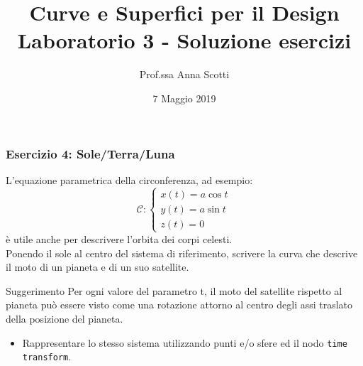 \documentclass{beamer}
\title[Curve e Sup. - Lab 3]{Curve e Superfici per il Design \\ Laboratorio 3 - Soluzione esercizi}
\author[Prof.ssa Scotti]{Prof.ssa Anna Scotti}
\date{7 Maggio 2019}
\begin{document}
\begin{frame}
\maketitle
\end{frame}
\begin{frame}
\frametitle{Esercizio 4: Sole/Terra/Luna}
L'equazione parametrica della circonferenza, ad esempio:
\begin{displaymath}
\mathcal{C}:\begin{cases}
 x(t)= a \cos t\\
 y(t)= a \sin t\\
 z(t)= 0
\end{cases}
\end{displaymath}
\`e utile anche per descrivere l'orbita dei corpi celesti. \\
Ponendo il sole al centro del sistema di riferimento, scrivere la curva che descrive il moto di un pianeta e di un suo satellite.\\
\begin{block}{Suggerimento}
Per ogni valore del parametro t, il moto del satellite rispetto al pianeta pu\`o essere visto come una rotazione
attorno al centro degli assi traslato della posizione del pianeta.  
\end{block}
\begin{itemize}
\item Rappresentare lo stesso sistema utilizzando punti e/o sfere ed il nodo \texttt{time transform}.
\end{itemize}
\end{frame}
\end{document}

